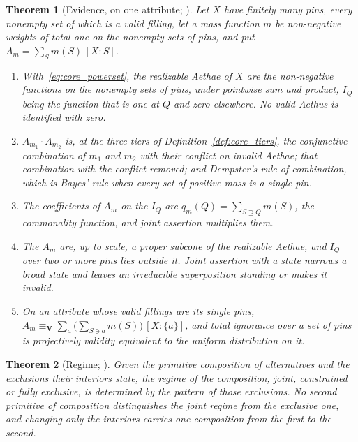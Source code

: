 \documentclass[11pt]{article}
\newtheorem{theorem}{Theorem}
\theoremstyle{definition}
\newcommand{\Aethus}{Aethus}
\begin{document}
\begin{theorem}[Evidence, on one attribute; \cite{AethusEvidence}]\label{thm:core_evidence}
Let $X$ have finitely many pins, every nonempty set of which is a valid filling, let a \emph{mass function} $m$ be non-negative weights of total one on the nonempty sets of pins, and put $A_m = \sum_S m(S)\,[X : S]$.
\begin{enumerate}
\item[(i)] With~\eqref{eq:core_powerset}, the realizable Aethae of $X$ are the non-negative functions on the nonempty sets of pins, under pointwise sum and product, $I_Q$ being the function that is one at $Q$ and zero elsewhere. No valid \Aethus{} is identified with zero.
\item[(ii)] $A_{m_1} \cdot A_{m_2}$ is, at the three tiers of Definition~\ref{def:core_tiers}, the conjunctive combination of $m_1$ and $m_2$ with their conflict on invalid Aethae; that combination with the conflict removed; and Dempster's rule of combination, which is Bayes' rule when every set of positive mass is a single pin.
\item[(iii)] The coefficients of $A_m$ on the $I_Q$ are $q_m(Q) = \sum_{S \supseteq Q} m(S)$, the commonality function, and joint assertion multiplies them.
\item[(iv)] The $A_m$ are, up to scale, a proper subcone of the realizable Aethae, and $I_Q$ over two or more pins lies outside it. Joint assertion with a state narrows a broad state and leaves an irreducible superposition standing or makes it invalid.
\item[(v)] On an attribute whose valid fillings are its single pins, $A_m \equiv_{\mathbf{V}} \sum_a \bigl(\sum_{S \ni a} m(S)\bigr)\,[X : \{a\}]$, and total ignorance over a set of pins is projectively validity equivalent to the uniform distribution on it.
\end{enumerate}
\end{theorem}

\begin{theorem}[Regime; \cite{AethusUnion}]\label{thm:core_regime}
Given the primitive composition of alternatives and the exclusions their interiors state, the regime of the composition, joint, constrained or fully exclusive, is determined by the pattern of those exclusions. No second primitive of composition distinguishes the joint regime from the exclusive one, and changing only the interiors carries one composition from the first to the second.
\end{theorem}
\end{document}
